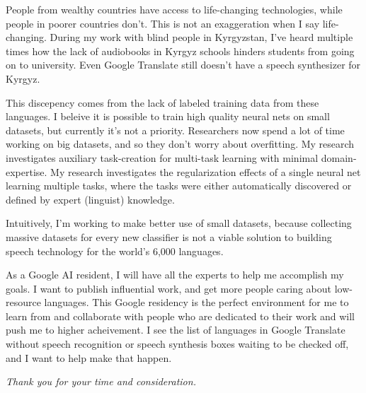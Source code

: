 \documentclass[12pt,a4paper]{article}
\begin{document}
People from wealthy countries have access to life-changing technologies, while people in poorer countries don't. This is not an exaggeration when I say life-changing. During my work with blind people in Kyrgyzstan, I've heard multiple times how the lack of audiobooks in Kyrgyz schools hinders students from going on to university. Even Google Translate still doesn't have a speech synthesizer for Kyrgyz.

This discepency comes from the lack of labeled training data from these languages. I beleive it is possible to train high quality neural nets on small datasets, but currently it's not a priority. Researchers now spend a lot of time working on big datasets, and so they don't worry about overfitting. My research investigates auxiliary task-creation for multi-task learning with minimal domain-expertise. My research investigates the regularization effects of a single neural net learning multiple tasks, where the tasks were either automatically discovered or defined by expert (linguist) knowledge.

Intuitively, I'm working to make better use of small datasets, because collecting massive datasets for every new classifier is not a viable solution to building speech technology for the world's 6,000 languages.

As a Google AI resident, I will have all the experts to help me accomplish my goals. I want to publish influential work, and get more people caring about low-resource languages. This Google residency is the perfect environment for me to learn from and collaborate with people who are dedicated to their work and will push me to higher acheivement. I see the list of languages in Google Translate without speech recognition or speech synthesis boxes waiting to be checked off, and I want to help make that happen.

\begin{center}
\textit{Thank you for your time and consideration.}  
\end{center}
\end{document}

